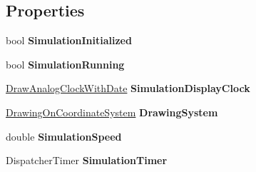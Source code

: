 \subsection*{Properties}
\begin{DoxyCompactItemize}
\item 
bool {\bfseries Simulation\+Initialized}\hypertarget{class_hi_co_simulator_1_1_main_window_aaaed83a9bd8d75125fcbae83c5a640cf}{}\label{class_hi_co_simulator_1_1_main_window_aaaed83a9bd8d75125fcbae83c5a640cf}

\item 
bool {\bfseries Simulation\+Running}\hypertarget{class_hi_co_simulator_1_1_main_window_a72fc56881f5ef1d4b54dec5420f759ac}{}\label{class_hi_co_simulator_1_1_main_window_a72fc56881f5ef1d4b54dec5420f759ac}

\item 
\hyperlink{class_w_p_f_visualization_base_1_1_draw_analog_clock_with_date}{Draw\+Analog\+Clock\+With\+Date} {\bfseries Simulation\+Display\+Clock}\hypertarget{class_hi_co_simulator_1_1_main_window_ac4698b4017e296426936f7d4f3c9ba25}{}\label{class_hi_co_simulator_1_1_main_window_ac4698b4017e296426936f7d4f3c9ba25}

\item 
\hyperlink{class_w_p_f_visualization_base_1_1_drawing_on_coordinate_system}{Drawing\+On\+Coordinate\+System} {\bfseries Drawing\+System}\hypertarget{class_hi_co_simulator_1_1_main_window_a6cdf66dea6b61e49bdc7f03f969dab8e}{}\label{class_hi_co_simulator_1_1_main_window_a6cdf66dea6b61e49bdc7f03f969dab8e}

\item 
double {\bfseries Simulation\+Speed}\hypertarget{class_hi_co_simulator_1_1_main_window_a48618bb33045f9e43e652a884dcc63d8}{}\label{class_hi_co_simulator_1_1_main_window_a48618bb33045f9e43e652a884dcc63d8}

\item 
Dispatcher\+Timer {\bfseries Simulation\+Timer}\hypertarget{class_hi_co_simulator_1_1_main_window_a53abc88f3edfa1728a10e8620c53d2f8}{}\label{class_hi_co_simulator_1_1_main_window_a53abc88f3edfa1728a10e8620c53d2f8}


\end{DoxyCompactItemize}
